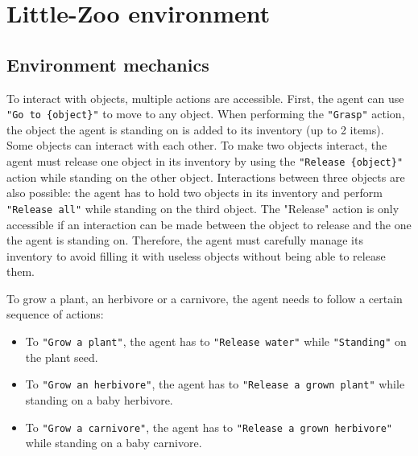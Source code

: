 \newpage
\section{Little-Zoo environment}\label{app:environment}

\subsection{Environment mechanics}
\label{app:environment_mechanics}
To interact with objects, multiple actions are accessible. First, the agent can use \texttt{"Go to \{object\}"} to move to any object. When performing the \texttt{"Grasp"} action, the object the agent is standing on is added to its inventory (up to 2 items). Some objects can interact with each other. To make two objects interact, the agent must release one object in its inventory by using the \texttt{"Release \{object\}"} action while standing on the other object. Interactions between three objects are also possible: the agent has to hold two objects in its inventory and perform \texttt{"Release all"} while standing on the third object. The "Release" action is only accessible if an interaction can be made between the object to release and the one the agent is standing on. Therefore, the agent must carefully manage its inventory to avoid filling it with useless objects without being able to release them.

To grow a plant, an herbivore or a carnivore, the agent needs to follow a certain sequence of actions:
\begin{itemize}
    \item To \texttt{"Grow a plant"}, the agent has to \texttt{"Release water"} while \texttt{"Standing"} on the plant seed.
    \item To \texttt{"Grow an herbivore"}, the agent has to \texttt{"Release a grown plant"} while standing on a baby herbivore.
    \item  To \texttt{"Grow a carnivore"}, the agent has to \texttt{"Release a grown herbivore"} while standing on a baby carnivore.
\end{itemize}


